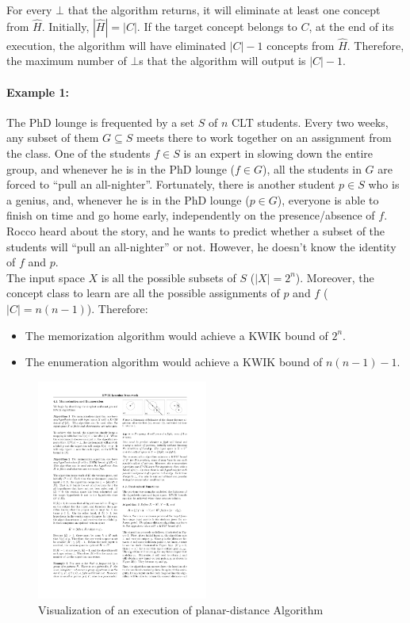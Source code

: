 For every $\bot$ that the algorithm returns, it will eliminate at least one
concept from $\hat{H}$. Initially, $|\hat{H}| = |C|$. If the target
concept belongs to $C$, at the end of its execution, the algorithm will have
eliminated $|C| - 1$ concepts from $\hat{H}$. Therefore, the maximum number
of $\bot$s that the algorithm will output is $|C| - 1$.

\paragraph{Example 1:} The PhD lounge is frequented by a set $S$ of $n$ CLT
students. Every two weeks, any subset of them $G \subseteq S$ meets there to work
together on an assignment from the class. One of the students $f \in S$ is an
expert in slowing down the entire group, and whenever he is in the PhD lounge
($f \in G$), all the students in $G$ are forced to ``pull an all-nighter''.
Fortunately, there is another student $p \in S$ who is a genius, and, whenever
he is in the PhD lounge ($p \in G$), everyone is able to finish on time and go
home early, independently on the presence/absence of $f$. Rocco heard about the
story, and he wants to predict whether a subset of the students will ``pull an
all-nighter'' or not. However, he doesn't know the identity of $f$ and $p$. \\

The input space $X$ is all the possible subsets of $S$ ($|X| = 2^n$). Moreover,
the concept class to learn are all the possible assignments of $p$ and $f$
($|C| = n(n - 1)$). Therefore:
\begin{itemize}
  \item The memorization algorithm would achieve a KWIK bound of $2^n$.
  \item The enumeration algorithm would achieve a KWIK bound of $n(n - 1) - 1$.
\end{itemize}

\begin{figure}
  \centering
  \includegraphics[width=0.5\textwidth]{figures/algorithm3.pdf}
  \caption{Visualization of an execution of planar-distance Algorithm}
  \label{fig:sec4.1}
\end{figure}

